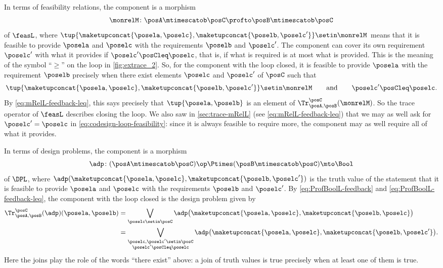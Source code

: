 In terms of feasibility relations, the component is a morphism
\begin{equation}
    \monrelM \colon \posA \mtimescatob \posC \profto \posB \mtimescatob \posC
\end{equation}
of $\feasL$, where $\tup{\maketupconcat{\posela, \poselc}, \maketupconcat{\poselb, \poselc'}} \setin \monrelM$ means that it is feasible to provide $\posela$ and $\poselc$ with the requirements $\poselb$ and $\poselc'$.
The component can cover its own requirement $\poselc'$ with what it provides if $\poselc' \posCleq \poselc$, that is, if what is required is at most what is provided.
This is the meaning of the symbol ``$\geq$'' on the loop in \cref{fig:extrace_2}.
So, for the component with the loop closed, it is feasible to provide $\posela$ with the requirement $\poselb$ precisely when there exist elements $\poselc$ and $\poselc'$ of $\posC$ such that
\begin{equation}
    \label{eq:codesign-loop-feasibility}
    \tup{\maketupconcat{\posela, \poselc}, \maketupconcat{\poselb, \poselc'}} \setin \monrelM
    \qquad \text{and} \qquad
    \poselc' \posCleq \poselc.
\end{equation}
By \cref{eq:mRelL-feedback-leq}, this says precisely that $\tup{\posela, \poselb}$ is an element of $\Tr_{\posA,\posB}^{\posC}(\monrelM)$.
So the trace operator of $\feasL$ describes closing the loop.
We also saw in \cref{sec:trace-mRelL} (see \cref{eq:mRelL-feedback-leq}) that we may as well ask for $\poselc' = \poselc$ in \cref{eq:codesign-loop-feasibility}: since it is always feasible to require more, the component may as well require all of what it provides.

In terms of design problems, the component is a morphism
\begin{equation}
    \adp \colon (\posA \mtimescatob \posC)\op \Ptimes (\posB \mtimescatob \posC) \mto \Bool
\end{equation}
of $\DPL$, where $\adp(\maketupconcat{\posela, \poselc}, \maketupconcat{\poselb, \poselc'})$ is the truth value of the statement that it is feasible to provide $\posela$ and $\poselc$ with the requirements $\poselb$ and $\poselc'$.
By \cref{eq:ProfBoolL-feedback} and \cref{eq:ProfBoolL-feedback-leq}, the component with the loop closed is the design problem given by
\begin{equation}
    \label{eq:codesign-loop-dp}
    \begin{aligned}
        \Tr_{\posA,\posB}^{\posC}(\adp)(\posela, \poselb)
         & = \bigvee_{\poselc \setin \posC} \adp\bigl(\maketupconcat{\posela, \poselc}, \maketupconcat{\poselb, \poselc}\bigr) \\
         & = \bigvee_{\substack{\poselc, \poselc' \setin \posC \\ \poselc' \posCleq \poselc}} \adp\bigl(\maketupconcat{\posela, \poselc}, \maketupconcat{\poselb, \poselc'}\bigr).
    \end{aligned}
\end{equation}
Here the joins play the role of the words ``there exist'' above: a join of truth values is true precisely when at least one of them is true.

